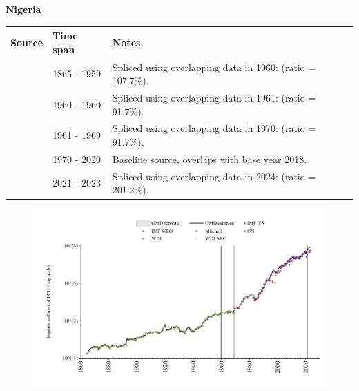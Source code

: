 \documentclass[12pt,a4paper,landscape]{article}
\begin{document}
\begin{adjustbox}{max totalsize={\paperwidth}{\paperheight},center}
\begin{minipage}[t][\textheight][t]{\textwidth}
\vspace*{0.5cm}
{}
\begin{center}
{\Large\bfseries Nigeria}
\end{center}
\vspace{0.5cm}
\begin{table}[H]
\centering
\small
\begin{tabular}{|l|l|l|}
\hline
\textbf{Source} & \textbf{Time span} & \textbf{Notes} \\
\hline
\rowcolor{white}\cite{Mitchell}& 1865 - 1959 &Spliced using overlapping data in 1960: (ratio = 107.7\%).\\
\rowcolor{lightgray}\cite{WDI}& 1960 - 1960 &Spliced using overlapping data in 1961: (ratio = 91.7\%).\\
\rowcolor{white}\cite{WDI_ARC}& 1961 - 1969 &Spliced using overlapping data in 1970: (ratio = 91.7\%).\\
\rowcolor{lightgray}\cite{UN}& 1970 - 2020 &Baseline source, overlaps with base year 2018.\\
\rowcolor{white}\cite{IMF_IFS}& 2021 - 2023 &Spliced using overlapping data in 2024: (ratio = 201.2\%).\\
\hline
\end{tabular}
\end{table}
\begin{figure}[H]
\centering
\includegraphics[width=\textwidth,height=0.6\textheight,keepaspectratio]{graphs/NGA_imports.pdf}
\end{figure}
\end{minipage}
\end{adjustbox}
\end{document}
